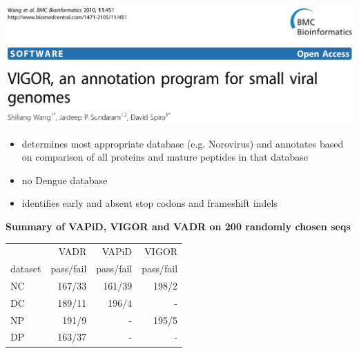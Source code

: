 \documentclass[landscape]{slides}
\begin{document}
\begin{slide}
\begin{center}
\includegraphics[width=10.5in]{figs/ss-vigor-title}
\end{center}

\small
\begin{itemize}
\item determines most appropriate database (e.g. Norovirus)
  and annotates based on comparison of all proteins and mature
  peptides in that database
\item no Dengue database
\item identifies early and absent stop codons and frameshift indels
\end{itemize}

\vfill
\end{slide}
\begin{slide}
\begin{center}
\textbf{Summary of VAPiD, VIGOR and VADR on 200 randomly chosen seqs}

\begin{tabular}{|l|r|r|r|}
\hline
         & VADR       & VAPiD     & VIGOR      \\
 dataset & pass/fail  & pass/fail & pass/fail  \\ \hline
       NC &  167/33 &  161/39 &   198/2 \\ 
       DC &  189/11 &   196/4 &       - \\ 
       NP &   191/9 &       - &   195/5 \\ 
       DP &  163/37 &       - &       - \\ 
\hline 
\end{tabular}
\end{center}

\vfill
\end{slide}
\end{document}
